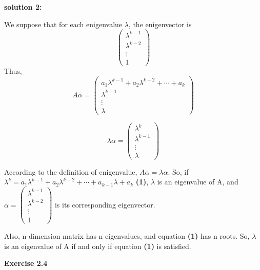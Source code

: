 \documentclass{article} %
\begin{document}
\textbf{solution 2:}\par
We suppose that for each enigenvalue $\lambda$, the enigenvector is
$$\begin{pmatrix}
\lambda^{k-1}\\
\lambda^{k-2}\\
\vdots\\
1
\end{pmatrix}
$$
Thus,$$
A\alpha = \begin{pmatrix}
a_1 \lambda^{k-1}+a_2\lambda^{k-2}+\cdots +a_k\\
\lambda^{k-1}\\
\vdots\\
\lambda
\end{pmatrix}
$$

$$\lambda \alpha = \begin{pmatrix}
\lambda^{k}\\
\lambda^{k-1}\\
\vdots\\
\lambda
\end{pmatrix}$$

According to the definition of enigenvalue, $A\alpha =\lambda \alpha$. So, if $\lambda^{k}=a_1 \lambda^{k-1}+a_2 \lambda^{k-2}+\cdots + a_{k-1}\lambda +a_k$  \textbf{(1)}, $\lambda$ is an eigenvalue of A, and 
$\alpha= \begin{pmatrix}
\lambda^{k-1}\\
\lambda^{k-2}\\
\vdots\\
1
\end{pmatrix}
$ is its corresponding eigenvector.\par
Also, n-dimension matrix has n eigenvalues, and equation \textbf{(1)} has n roots. So, $\lambda$ is an eigenvalue of A if and only if equation \textbf{(1)} is satisfied. 






	\textbf{Exercise 2.4}\par
	
\end{document}
